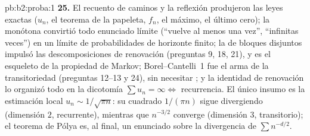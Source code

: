 \begin{solution}{pb:b2:proba:1}
\textbf{25.} El recuento de caminos y la reflexión produjeron las
leyes exactas ($u_n$, el teorema de la papeleta, $f_n$, el máximo, el
último cero); la  monótona convirtió todo enunciado
límite (``vuelve al menos una vez'', ``infinitas veces'') en un
límite de probabilidades de horizonte finito; la  de
bloques disjuntos impulsó las descomposiciones de renovación
(preguntas 9, 18, 21), y es el esqueleto  de la propiedad de
Markov; Borel--Cantelli~1 fue el arma de la transitoriedad (preguntas
12--13 y 24), sin necesitar ; y la identidad de
renovación lo organizó todo en la dicotomía $\sum u_n = \infty \iff$
recurrencia. El único insumo  es la estimación local $u_n
\sim 1/\sqrt{\pi n}$: su cuadrado $1/(\pi n)$ sigue divergiendo
(dimensión $2$, recurrente), mientras que $n^{-3/2}$ converge
(dimensión $3$, transitorio); el teorema de Pólya es, al final, un
enunciado sobre la divergencia de $\sum n^{-d/2}$.
\end{solution}
